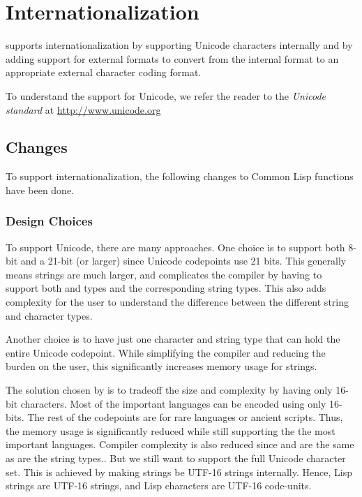 \chapter{Internationalization}
\label{i18n}

\cmucl{} supports internationalization by supporting Unicode
characters internally and by adding support for external formats to
convert from the internal format to an appropriate external character
coding format.

To understand the support for Unicode, we refer the reader to the
\emph{Unicode standard} at \url{http://www.unicode.org}
\section{Changes}

To support internationalization, the following changes to Common Lisp
functions have been done.


\subsection{Design Choices}

To support Unicode, there are many approaches.  One choice is to
support both 8-bit  and a 21-bit (or larger)
 since Unicode codepoints use 21 bits.  This generally
means strings are much larger, and complicates the compiler by having
to support both  and  types and the
corresponding string types.  This also adds complexity for the user to
understand the difference between the different string and character
types.

Another choice is to have just one character and string type that can
hold the entire Unicode codepoint.  While simplifying the compiler and
reducing the burden on the user, this significantly increases memory
usage for strings.

The solution chosen by \cmucl{} is to tradeoff the size and complexity
by having only 16-bit characters.  Most of the important languages can
be encoded using only 16-bits.  The rest of the codepoints are for
rare languages or ancient scripts.  Thus, the memory usage is
significantly reduced while still supporting the the most important
languages.  Compiler complexity is also reduced since 
and  are the same as are the string types..  But we
still want to support the full Unicode character set.  This is
achieved by making strings be UTF-16 strings internally.  Hence, Lisp
strings are UTF-16 strings, and Lisp characters are UTF-16 code-units.


